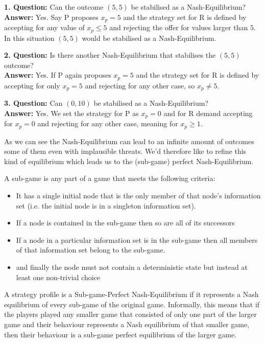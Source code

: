 \begin{example}
	\textbf{1. Question:} Can the outcome $(5, 5)$ be stabilised as a Nash-Equilibrium? \\
	\textbf{Answer:} Yes. Say P proposes $x_{p} = 5$ and the strategy set for R is defined by accepting for any value of $x_{p} \leq 5$ and rejecting the offer for values larger than $5$. \\
		In this situation $(5, 5)$ would be stabilised as a Nash-Equilibrium.


	\textbf{2. Question:} Is there another Nash-Equilibrium that stabilises the $(5, 5)$ outcome? \\
	\textbf{Answer:} Yes. If P again proposes $x_{p} = 5$ and the strategy set for R is defined by accepting for only $x_{p} = 5$ and rejecting for any other case, so $x_{p} \neq 5$. 
	
	
	\textbf{3. Question:} Can $(0, 10)$ be stabilised as a Nash-Equilibrium? \\
	\textbf{Answer:} Yes. We set the strategy for P as $x_{p} = 0$ and for R demand accepting for $x_{p} = 0$ and rejecting for any other case, meaning for $x_{p} \geq 1$. 
\end{example}
As we can see the Nash-Equilibrium can lead to an infinite amount of outcomes some of them even with implausible threats. We'd therefore like to refine this kind of equilibrium which leads us to the (sub-game) perfect Nash-Equilibrium.

\begin{definition} 
	A sub-game is any part of a game that meets the following criteria:
	\begin{itemize}
		\item It has a single initial node that is the only member of that node's information set (i.e. the initial node is in a singleton information set).
		\item If a node is contained in the sub-game then so are all of its successors
		\item If a node in a particular information set is in the sub-game then all members of that information set belong to the sub-game.
		\item and finally the node must not contain a deterministic state but instead at least one non-trivial choice
	\end{itemize}
\end{definition}

\begin{definition}  
A strategy profile is a Sub-game-Perfect Nash-Equilibrium if it represents a Nash equilibrium of every sub-game of the original game. Informally, this means that if the players played any smaller game that consisted of only one part of the larger game and their behaviour represents a Nash equilibrium of that smaller game, then their behaviour is a sub-game perfect equilibrium of the larger game. 
\end{definition}


